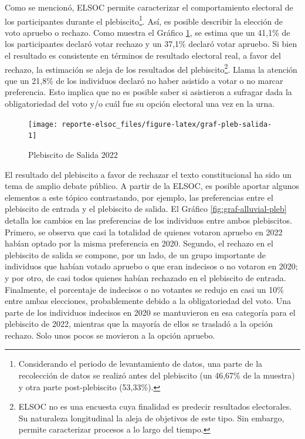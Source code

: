 \documentclass[
  12pt,
]{book}
\begin{document}
Como se mencionó, ELSOC permite caracterizar el comportamiento electoral de los participantes durante el plebiscito\footnote{Considerando el periodo de levantamiento de datos, una parte de la recolección de datos se realizó antes del plebiscito (un 46,67\% de la muestra) y otra parte post-plebiscito (53,33\%).}. Así, es posible describir la elección de voto apruebo o rechazo. Como muestra el Gráfico \ref{fig:graf-pleb-salida}, se estima que un 41,1\% de los participantes declaró votar rechazo y un 37,1\% declaró votar apruebo. Si bien el resultado es consistente en términos de resultado electoral real, a favor del rechazo, la estimación se aleja de los resultados del plebiscito\footnote{ELSOC no es una encuesta cuya finalidad es predecir resultados electorales. Su naturaleza longitudinal la aleja de objetivos de este tipo. Sin embargo, permite caracterizar procesos a lo largo del tiempo.}. Llama la atención que un 21,8\% de los individuos declaró no haber asistido a votar o no marcar preferencia. Esto implica que no es posible saber si asistieron a sufragar dada la obligatoriedad del voto y/o cuál fue su opción electoral una vez en la urna.

\begin{figure}

{\centering \texttt{[image: reporte-elsoc\_files/figure-latex/graf-pleb-salida-1]} 

}

\caption{Plebiscito de Salida 2022}\label{fig:graf-pleb-salida}
\end{figure}

El resultado del plebiscito a favor de rechazar el texto constitucional ha sido un tema de amplio debate público. A partir de la ELSOC, es posible aportar algunos elementos a este tópico contrastando, por ejemplo, las preferencias entre el plebiscito de entrada y el plebiscito de salida. El Gráfico \ref{fig:graf-alluvial-pleb} detalla los cambios en las preferencias de los individuos entre ambos plebiscitos. Primero, se observa que casi la totalidad de quienes votaron apruebo en 2022 habían optado por la misma preferencia en 2020. Segundo, el rechazo en el plebiscito de salida se compone, por un lado, de un grupo importante de individuos que habían votado apruebo o que eran indecisos o no votaron en 2020; y por otro, de casi todos quienes habían rechazado en el plebiscito de entrada. Finalmente, el porcentaje de indecisos o no votantes se redujo en casi un 10\% entre ambas elecciones, probablemente debido a la obligatoriedad del voto. Una parte de los individuos indecisos en 2020 se mantuvieron en esa categoría para el plebiscito de 2022, mientras que la mayoría de ellos se trasladó a la opción rechazo. Solo unos pocos se movieron a la opción apruebo.
\end{document}
